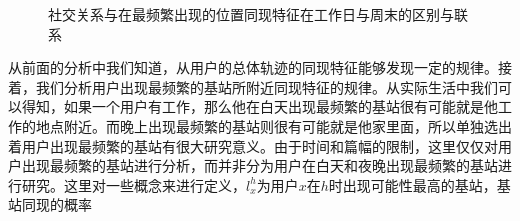 \begin{figure}[!ht]
    \centering
    \hspace{7em} %
    \caption{社交关系与在最频繁出现的位置同现特征在工作日与周末的区别与联系}
    \label{fig-spatialhomoMost}
\end{figure}


从前面的分析中我们知道，从用户的总体轨迹的同现特征能够发现一定的规律。接着，我们分析用户出现最频繁的基站所附近同现特征的规律。从实际生活中我们可以得知，如果一个用户有工作，那么他在白天出现最频繁的基站很有可能就是他工作的地点附近。而晚上出现最频繁的基站则很有可能就是他家里面，所以单独选出着用户出现最频繁的基站有很大研究意义。由于时间和篇幅的限制，这里仅仅对用户出现最频繁的基站进行分析，而并非分为用户在白天和夜晚出现最频繁的基站进行研究。这里对一些概念来进行定义，$l_x^h$为用户$x$在$h$时出现可能性最高的基站，基站同现的概率

